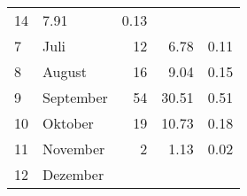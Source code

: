 \begin{longtable}{lXrrr}
       \num{14} &
       \num[round-mode=places,round-precision=2]{7.91} &
         \num[round-mode=places,round-precision=2]{0.13} \\

     7 &
     \multicolumn{1}{X}{ Juli   } &


       \num{12} &
       \num[round-mode=places,round-precision=2]{6.78} &
         \num[round-mode=places,round-precision=2]{0.11} \\

     8 &
     \multicolumn{1}{X}{ August   } &


       \num{16} &
       \num[round-mode=places,round-precision=2]{9.04} &
         \num[round-mode=places,round-precision=2]{0.15} \\

     9 &
     \multicolumn{1}{X}{ September   } &


       \num{54} &
       \num[round-mode=places,round-precision=2]{30.51} &
         \num[round-mode=places,round-precision=2]{0.51} \\

     10 &
     \multicolumn{1}{X}{ Oktober   } &


       \num{19} &
       \num[round-mode=places,round-precision=2]{10.73} &
         \num[round-mode=places,round-precision=2]{0.18} \\

     11 &
     \multicolumn{1}{X}{ November   } &


       \num{2} &
       \num[round-mode=places,round-precision=2]{1.13} &
         \num[round-mode=places,round-precision=2]{0.02} \\

     12 &
     \multicolumn{1}{X}{ Dezember   } &



\end{longtable}
